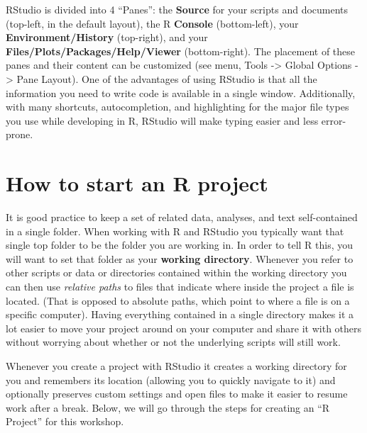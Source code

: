 \documentclass[]{book}
\theoremstyle{definition}
\theoremstyle{definition}
\theoremstyle{remark}
\begin{document}
RStudio is divided into 4 ``Panes'': the \textbf{Source} for your
scripts and documents (top-left, in the default layout), the R
\textbf{Console} (bottom-left), your \textbf{Environment/History}
(top-right), and your \textbf{Files/Plots/Packages/Help/Viewer}
(bottom-right). The placement of these panes and their content can be
customized (see menu, Tools -\textgreater{} Global Options
-\textgreater{} Pane Layout). One of the advantages of using RStudio is
that all the information you need to write code is available in a single
window. Additionally, with many shortcuts, autocompletion, and
highlighting for the major file types you use while developing in R,
RStudio will make typing easier and less error-prone.

\section{How to start an R project}\label{how-to-start-an-r-project}

It is good practice to keep a set of related data, analyses, and text
self-contained in a single folder. When working with R and RStudio you
typically want that single top folder to be the folder you are working
in. In order to tell R this, you will want to set that folder as your
\textbf{working directory}. Whenever you refer to other scripts or data
or directories contained within the working directory you can then use
\emph{relative paths} to files that indicate where inside the project a
file is located. (That is opposed to absolute paths, which point to
where a file is on a specific computer). Having everything contained in
a single directory makes it a lot easier to move your project around on
your computer and share it with others without worrying about whether or
not the underlying scripts will still work.

Whenever you create a project with RStudio it creates a working
directory for you and remembers its location (allowing you to quickly
navigate to it) and optionally preserves custom settings and open files
to make it easier to resume work after a break. Below, we will go
through the steps for creating an ``R Project'' for this workshop.
\end{document}
